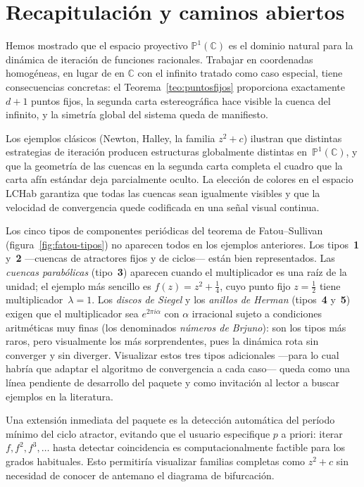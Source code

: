 \documentclass[11pt,a4paper]{article}
\theoremstyle{plain}
\theoremstyle{definition}
\theoremstyle{remark}
\newcommand{\C}{\mathbb{C}}
\newcommand{\Puno}{\mathbb{P}^1(\mathbb{C})}
\begin{document}
\section{Recapitulación y caminos abiertos}
\label{sec:conclusion}

Hemos mostrado que el espacio proyectivo $\Puno$ es el dominio natural
para la dinámica de iteración de funciones racionales.
Trabajar en coordenadas homogéneas, en lugar de en $\C$ con el infinito
tratado como caso especial, tiene consecuencias concretas: el
Teorema~\ref{teo:puntosfijos} proporciona exactamente $d+1$ puntos fijos, la
segunda carta estereográfica hace visible la cuenca del infinito, y la
simetría global del sistema queda de manifiesto.

Los ejemplos clásicos (Newton, Halley, la familia $z^2+c$)  ilustran
que distintas estrategias de iteración producen estructuras globalmente
distintas en~$\Puno$, y que la geometría de las cuencas en la segunda
carta completa el cuadro que la carta afín estándar deja parcialmente
oculto.
La elección de colores en el espacio LCHab garantiza que todas las
cuencas sean igualmente visibles y que la velocidad de convergencia
quede codificada en una señal visual continua.

Los cinco tipos de componentes periódicas del teorema de
Fatou--Sullivan (figura~\ref{fig:fatou-tipos}) no aparecen todos en
los ejemplos anteriores.
Los tipos~\textbf{1} y~\textbf{2} —cuencas de atractores fijos y de ciclos— están
bien representados.
Las \emph{cuencas parabólicas} (tipo~\textbf{3}) aparecen cuando el
multiplicador es una raíz de la unidad; el ejemplo más sencillo es
$f(z)=z^2+\tfrac{1}{4}$, cuyo punto fijo $z=\tfrac{1}{2}$ tiene
multiplicador~$\lambda=1$.
Los \emph{discos de Siegel} y los \emph{anillos de Herman}
(tipos~\textbf{4} y~\textbf{5}) exigen que el multiplicador sea $e^{2\pi i\alpha}$ con
$\alpha$ irracional sujeto a condiciones aritméticas muy finas
(los denominados \emph{números de Brjuno}): son los tipos más raros,
pero visualmente los más sorprendentes, pues la dinámica rota sin
converger y sin diverger.
Visualizar estos tres tipos adicionales —para lo cual habría que
adaptar el algoritmo de convergencia a cada caso— queda como una
línea pendiente de desarrollo  del paquete y como invitación al lector
a buscar ejemplos en la literatura.

Una extensión inmediata del paquete es la detección automática del
período mínimo del ciclo atractor, evitando que el usuario especifique
$p$ a priori: iterar $f, f^2, f^3,\ldots$ hasta detectar coincidencia
es computacionalmente factible para los grados habituales.
Esto permitiría visualizar familias completas como $z^2+c$ sin
necesidad de conocer de antemano el diagrama de bifurcación.
\end{document}
